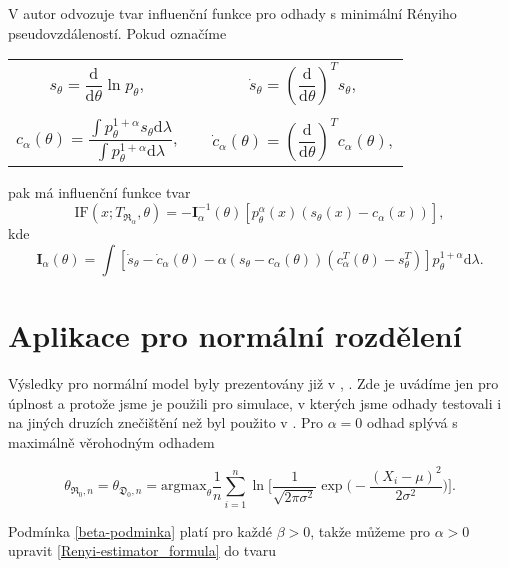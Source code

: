 V \cite{Vajda2009} autor odvozuje tvar influenční funkce pro odhady s minimální Rényiho pseudovzdáleností. Pokud označíme 
\begin{center}
	\begin{tabular}{c c}
	$s_\theta = \dfrac{\mathrm{d}}{\mathrm{d}\theta} \ln p_\theta, \quad$ & $ \dot{s}_\theta = \left( \dfrac{\mathrm{d}}{\mathrm{d}\theta} \right)^T s_\theta,$ \\ 
	&\\
	$c_\alpha(\theta) = \dfrac{\int p_\theta^{1+\alpha}s_\theta \mathrm{d}\lambda}{\int p_\theta^{1+\alpha} \mathrm{d}\lambda}, \quad$ & $\dot{c}_\alpha(\theta)= \left( \dfrac{\mathrm{d}}{\mathrm{d}\theta} \right)^T c_\alpha(\theta),$  \\ 
	\end{tabular} 
\end{center}
pak má influenční funkce tvar 
\begin{equation}
	\mathrm{IF}(x;T_{\mathfrak{R}_\alpha},\theta) = -\mathbf{I}^{-1}_{\alpha}(\theta) \left[ p_\theta^\alpha(x) (s_\theta (x) - c_\alpha (x)) \right], 
	\label{IF}
\end{equation}
kde 
\begin{equation}
\mathbf{I}_{\alpha}(\theta) = \int{ \left[\dot{s}_\theta - \dot{c}_\alpha(\theta) - \alpha(s_\theta - c_\alpha(\theta))(c^T_\alpha(\theta) - s^T_\theta) \right] p_\theta^{1+\alpha} \mathrm{d}\lambda}.
\end{equation}

\section{Aplikace pro normální rozdělení}

Výsledky pro normální model byly prezentovány již v \cite{Vajda2009}, \cite{Demut2010}. Zde je uvádíme jen pro úplnost a protože jsme je použili pro simulace, v kterých jsme odhady testovali i na jiných druzích znečištění než byl použito v \cite{Demut2010}.
Pro $\alpha = 0$ odhad splývá s maximálně věrohodným odhadem

\begin{equation}
\theta_{\mathfrak{R}_0,n} = \theta_{\mathfrak{D}_0,n} = \text{argmax}_{\theta} \frac{1}{n}\sum_{i=1}^n \ln \biggl[\frac{1}{\sqrt{2\pi \sigma^2}} \exp\biggl(-\frac{(X_i-\mu)^2}{2\sigma^2}\biggr)\biggr].
\end{equation}

\noindent Podmínka \eqref{beta-podminka} platí pro každé $\beta > 0$, takže můžeme pro $\alpha>0$ upravit {\mRao} \eqref{Renyi-estimator_formula} do tvaru

